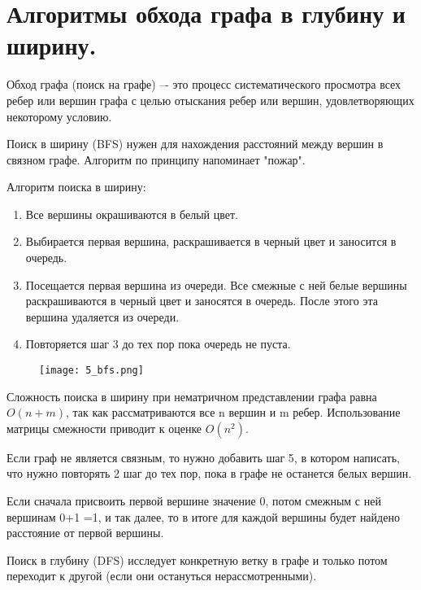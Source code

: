 \section{Алгоритмы обхода графа в глубину и ширину.}

\begin{definition}
    Обход графа (поиск на графе) –- это процесс систематического просмотра
    всех ребер или вершин графа с целью отыскания ребер или вершин,
    удовлетворяющих некоторому условию.
\end{definition}

\begin{definition}
    Поиск в ширину (BFS) нужен для нахождения расстояний между вершин в связном графе.
    Алгоритм по принципу напоминает "пожар".
\end{definition}

Алгоритм поиска в ширину:
\begin{enumerate}[left=0.0em, labelsep=1em, topsep=0em, itemsep=0pt, parsep=0.5em]
    \item Все вершины окрашиваются в белый цвет.
    \item Выбирается первая вершина, раскрашивается в черный цвет и заносится в очередь.
    \item Посещается первая вершина из очереди. Все смежные с ней белые вершины
    раскрашиваются в черный цвет и заносятся в очередь. После этого эта вершина удаляется
    из очереди.
    \item Повторяется шаг 3 до тех пор пока очередь не пуста.
\end{enumerate}

\begin{figure}[h]
    \centering
    \texttt{[image: 5\_bfs.png]}
\end{figure}

Сложность поиска в ширину при нематричном представлении графа
равна $O(n+m)$, так как рассматриваются все n вершин и m ребер.
Использование матрицы смежности приводит к оценке $O(n^2)$.

Если граф не является связным, то нужно добавить шаг 5, в
котором написать, что нужно повторять 2 шаг до тех пор, пока в графе не
останется белых вершин.

Если сначала присвоить первой вершине значение 0, потом
смежным с ней вершинам 0+1 =1, и так далее, то в итоге для каждой
вершины будет найдено расстояние от первой вершины.
\newpage

\begin{definition}
    Поиск в глубину (DFS) исследует конкретную ветку в графе и только потом переходит к другой (если они остануться нерассмотренными).
\end{definition}

